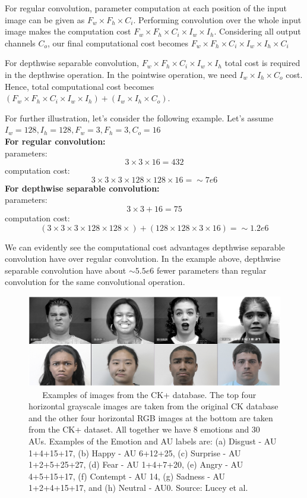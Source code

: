 \documentclass[master]{thesis-uestc}
\begin{document}
For regular convolution, parameter computation at each position of the input image can be given as $F_w \times F_h \times C_i$. Performing convolution over the whole input image makes the computation cost $F_w \times F_h \times C_i \times I_w \times I_h$. Considering all output channels $C_o$, our final computational cost becomes $F_w \times F_h \times C_i \times I_w \times I_h \times C_i$

For depthwise separable convolution, $F_w \times F_h \times C_i \times I_w \times I_h$ total cost is required in the depthwise operation. In the pointwise operation, we need $I_w \times I_h \times C_o$ cost. Hence, total computational cost becomes $(F_w \times F_h \times C_i \times I_w \times I_h) + (I_w \times I_h \times C_o)$.

For further illustration, let's consider the following example. Let's assume $I_w = 128, I_h = 128, F_w = 3, F_h = 3, C_o = 16$ \\
\textbf{For regular convolution:} \\
parameters:
\[3 \times 3 \times 16 = 432\]
computation cost:
\[3 \times 3 \times 3 \times 128 \times 128 \times 16 = \sim7e6\]
\textbf{For depthwise separable convolution:}\\
parameters:
\[3 \times 3 + 16 = 75 \]
computation cost:
\[(3 \times 3 \times 3 \times 128 \times 128 \times) + (128 \times 128 \times 3 \times 16) = \sim1.2e6 \]

We can evidently see the computational cost advantages depthwise separable convolution have over regular convolution. In the example above, depthwise separable convolution have about $\sim5.5e6$ fewer parameters than regular convolution for the same convolutional operation.

\begin{figure}[ht]
\includegraphics[width=5in]{pic/ck+.PNG}
\caption{\,\,\,\,\,\,\,\,\,\,Examples of images from the CK+ database. The top four horizontal grayscale images are taken from the original CK database and the other four horizontal RGB images at the bottom are taken from the CK+ dataset. All together we have 8 emotions and 30 AUs. Examples of the Emotion and AU labels
are: (a) Disgust - AU 1+4+15+17, (b) Happy - AU 6+12+25, (c) Surprise - AU 1+2+5+25+27, (d) Fear - AU 1+4+7+20, (e) Angry - AU 4+5+15+17, (f) Contempt - AU 14, (g) Sadness - AU 1+2+4+15+17, and (h) Neutral - AU0. Source: Lucey et al.\cite{5543262}}
\label{CK+_images}
\end{figure}
\end{document}
